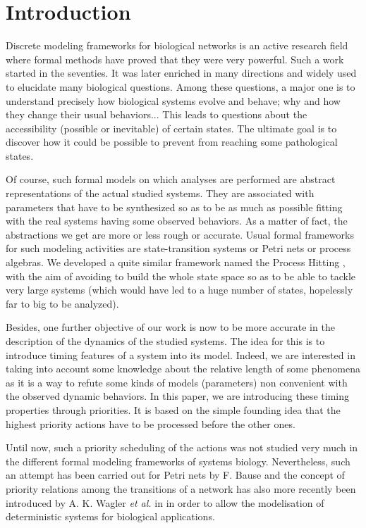 \section{Introduction}
\label{sec:intro}

Discrete modeling frameworks for biological networks is an active research field where formal methods have proved that they were very powerful.
Such a work started in the seventies.
It was later enriched in many directions and widely used to elucidate many biological questions.
Among these questions, a major one is to understand precisely how biological systems evolve and behave; why and how they change their usual behaviors...
This leads to questions about the accessibility (possible or inevitable) of certain states.
The ultimate goal is to discover how it could be possible to prevent from reaching some pathological states.

Of course, such formal models on which analyses are performed are abstract representations of the actual studied systems.
They are associated with parameters that have to be synthesized so as to be as much as possible fitting with the real systems having some observed behaviors.
As a matter of fact, the abstractions we get are more or less rough or accurate.
Usual formal frameworks for such modeling activities are state-transition systems or Petri nets or process algebras.
We developed a quite similar framework named the Process Hitting \cite{PMR10-TCSB}, with the aim of avoiding to build the whole state space so as to be able to tackle very large systems (which would have led to a huge number of states, hopelessly far to big to be analyzed).

Besides, one further objective of our work is now to be more accurate in the description of the dynamics of the studied systems.
The idea for this is to introduce timing features of a system into its model.
Indeed, we are interested in taking into account some knowledge about the relative length of some phenomena as it is a way to refute some kinds of models (parameters) non convenient with the observed dynamic behaviors.
In this paper, we are introducing these timing properties through priorities.
It is based on the simple founding idea that the highest priority actions have to be processed before the other ones.

Until now, such a priority scheduling of the actions was not studied very much in the different formal modeling frameworks of systems biology.
Nevertheless, such an attempt has been carried out for Petri nets by F. Bause \cite{Bause97} and the concept of priority relations among the transitions of a network has also more recently been introduced by A. K. Wagler \textit{et al.} in \cite{waw,WaglerW12} in order to allow the modelisation of deterministic systems for biological applications.

